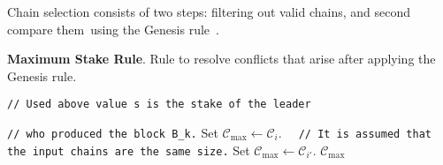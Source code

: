 Chain selection consists of two steps: filtering out valid chains, and second compare them\
using the Genesis rule~\cite{Badertscher2018}.

\bigbreak
\noindent
{}
\textbf{Maximum Stake Rule}.\label{apndx:max-stake-rule}
Rule to resolve conflicts that arise after applying the Genesis rule.
\begin{algo}
    \caption{${\textsf{MaxStakeChain}(\mathcal{C}_i}, \mathcal{C}_{i'})$}
    \begin{algorithmic}[1]

            \noindent
            \lstinline|// Used above value s is the stake of the leader|

            \noindent
            \lstinline|// who produced the block B_k.|
            \State Set ${\mathcal{C}_{\max} \leftarrow \mathcal{C}_{i}}$.
        \Else
            \noindent
            \lstinline|  // It is assumed that the input chains are the same size.|
            \State Set ${\mathcal{C}_{\max} \leftarrow \mathcal{C}_{i'}}$.
        \EndIf
        \State \Return ${\mathcal{C}_{\max}}$
    \end{algorithmic}\label{alg:max-stake-rule}
\end{algo}

